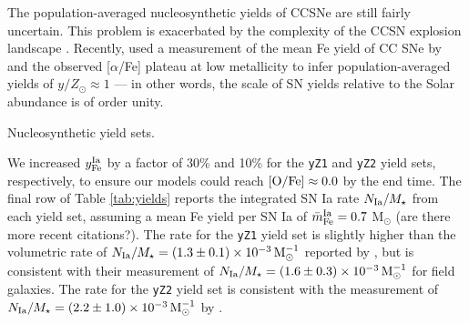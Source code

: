 \documentclass[twocolumn,twocolappendix,linenumbers]{aastex631}
\newcommand{\aFe}{[$\alpha$/Fe]\xspace}
\newcommand{\todo}[1]{{\color{red}#1}}
\begin{document}
The population-averaged nucleosynthetic yields of CCSNe are still fairly uncertain. This problem is exacerbated by the complexity of the CCSN explosion landscape \citep{sukhbold_core-collapse_2016}. Recently, \citet{weinberg_scale_2024} used a measurement of the mean Fe yield of CC SNe by \citet{rodriguez_iron_2023} and the observed \aFe plateau at low metallicity to infer population-averaged yields of $y/Z_\odot\approx1$ --- in other words, the scale of SN yields relative to the Solar abundance is of order unity.

\begin{table}
    \centering
    \caption{Nucleosynthetic yield sets.}
    \label{tab:yields}
    
\end{table}

We increased $y_{\rm Fe}^{\rm Ia}$ by a factor of 30\% and 10\% for the {\tt yZ1} and {\tt yZ2} yield sets, respectively, to ensure our models could reach ${\rm [O/Fe]}\approx0.0$ by the end time. The final row of Table \ref{tab:yields} reports the integrated SN Ia rate $N_{\rm Ia}/M_\star$ from each yield set, assuming a mean Fe yield per SN Ia of $\bar m_{\rm Fe}^{\rm Ia}=0.7$ M$_\odot$ \citep{mazzali_common_2007,howell_effect_2009} \todo{(are there more recent citations?)}. The rate for the {\tt yZ1} yield set is slightly higher than the volumetric rate of $N_{\rm Ia}/M_\star=(1.3\pm0.1)\times10^{-3}\,{\rm M}_\odot^{-1}$ reported by \citet{maoz_star_2017}, but is consistent with their measurement of $N_{\rm Ia}/M_\star=(1.6\pm0.3)\times10^{-3}\,{\rm M}_\odot^{-1}$ for field galaxies. The rate for the {\tt yZ2} yield set is consistent with the measurement of $N_{\rm Ia}/M_\star=(2.2\pm1.0)\times10^{-3}\,{\rm M}_\odot^{-1}$ by \citet{maoz_type-ia_2012}.
\end{document}
